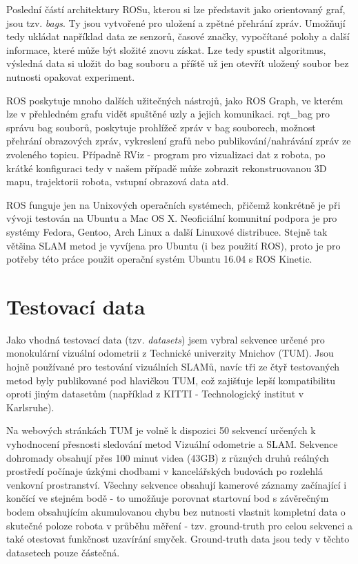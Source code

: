 \documentclass[12pt,a4paper]{report}
\begin{document}
Poslední částí architektury ROSu, kterou si lze představit jako orientovaný graf, jsou tzv. \textit{bags}. Ty jsou vytvořené pro uložení a zpětné přehrání zpráv. Umožňují tedy ukládat například data ze senzorů, časové značky, vypočítané polohy a další informace, které může být složité znovu získat. Lze tedy spustit algoritmus, výsledná data si uložit do bag souboru a příště už jen otevřít uložený soubor bez nutnosti opakovat experiment.

ROS poskytuje mnoho dalších užitečných nástrojů, jako ROS Graph, ve kterém lze v přehledném grafu vidět spuštěné uzly a jejich komunikaci. rqt\_bag pro správu bag souborů, poskytuje prohlížeč zpráv v bag souborech, možnost přehrání obrazových zpráv, vykreslení grafů nebo publikování/nahrávání zpráv ze zvoleného topicu. Případně RViz - program pro vizualizaci dat z robota, po krátké konfiguraci tedy v našem případě může zobrazit rekonstruovanou 3D mapu, trajektorii robota, vstupní obrazová data atd.

ROS funguje jen na Unixových operačních systémech, přičemž konkrétně je při vývoji testován na Ubuntu a Mac OS X. Neoficiální komunitní podpora je pro systémy Fedora, Gentoo, Arch Linux a další Linuxové distribuce. Stejně tak většina SLAM metod je vyvíjena pro Ubuntu (i bez použití ROS), proto je pro potřeby této práce použit operační systém Ubuntu 16.04 s ROS Kinetic.


\section{Testovací data}
Jako vhodná testovací data (tzv. \textit{datasets}) jsem vybral sekvence určené pro monokulární vizuální odometrii z Technické univerzity Mnichov (TUM). Jsou hojně používané pro testování vizuálních SLAMů, navíc tři ze čtyř testovaných metod byly publikované pod hlavičkou TUM, což zajišťuje lepší kompatibilitu oproti jiným datasetům (například z KITTI - Technologický institut v Karlsruhe). 

Na webových stránkách TUM je volně k dispozici 50 sekvencí určených k vyhodnocení přesnosti sledování metod Vizuální odometrie a SLAM. Sekvence dohromady obsahují přes 100 minut videa (43GB) z různých druhů reálných prostředí počínaje úzkými chodbami v kancelářských budovách po rozlehlá venkovní prostranství. Všechny sekvence obsahují kamerové záznamy začínající i končící ve stejném bodě - to umožňuje porovnat startovní bod s závěrečným bodem obsahujícím akumulovanou chybu bez nutnosti vlastnit kompletní data o skutečné poloze robota v průběhu měření - tzv. ground-truth pro celou sekvenci a také otestovat funkčnost uzavírání smyček. Ground-truth data jsou  tedy v těchto datasetech pouze částečná.
\end{document}
